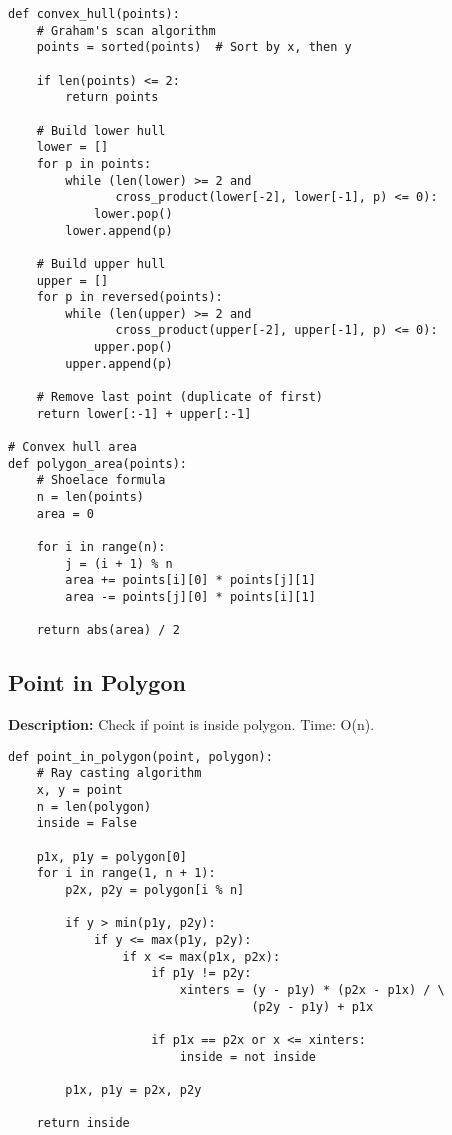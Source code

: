 \begin{lstlisting}
def convex_hull(points):
    # Graham's scan algorithm
    points = sorted(points)  # Sort by x, then y
    
    if len(points) <= 2:
        return points
    
    # Build lower hull
    lower = []
    for p in points:
        while (len(lower) >= 2 and 
               cross_product(lower[-2], lower[-1], p) <= 0):
            lower.pop()
        lower.append(p)
    
    # Build upper hull
    upper = []
    for p in reversed(points):
        while (len(upper) >= 2 and 
               cross_product(upper[-2], upper[-1], p) <= 0):
            upper.pop()
        upper.append(p)
    
    # Remove last point (duplicate of first)
    return lower[:-1] + upper[:-1]

# Convex hull area
def polygon_area(points):
    # Shoelace formula
    n = len(points)
    area = 0
    
    for i in range(n):
        j = (i + 1) % n
        area += points[i][0] * points[j][1]
        area -= points[j][0] * points[i][1]
    
    return abs(area) / 2
\end{lstlisting}

\subsection{Point in Polygon}
\textbf{Description:} Check if point is inside polygon. Time: O(n).

\begin{lstlisting}
def point_in_polygon(point, polygon):
    # Ray casting algorithm
    x, y = point
    n = len(polygon)
    inside = False
    
    p1x, p1y = polygon[0]
    for i in range(1, n + 1):
        p2x, p2y = polygon[i % n]
        
        if y > min(p1y, p2y):
            if y <= max(p1y, p2y):
                if x <= max(p1x, p2x):
                    if p1y != p2y:
                        xinters = (y - p1y) * (p2x - p1x) / \
                                  (p2y - p1y) + p1x
                    
                    if p1x == p2x or x <= xinters:
                        inside = not inside
        
        p1x, p1y = p2x, p2y
    
    return inside
\end{lstlisting}


